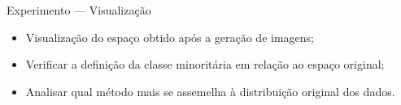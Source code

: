 \documentclass{beamer}
\begin{document}
%
\begin{frame}{Experimento --- Visualização}
  \setlength\leftmargini{1em}
  \begin{itemize}
  \item Visualização do espaço obtido após a geração de imagens;
  \item Verificar a definição da classe minoritária em relação ao espaço original;
  \item Analisar qual método mais se assemelha à distribuição original dos dados.
  \end{itemize}
\end{frame}
\end{document}
